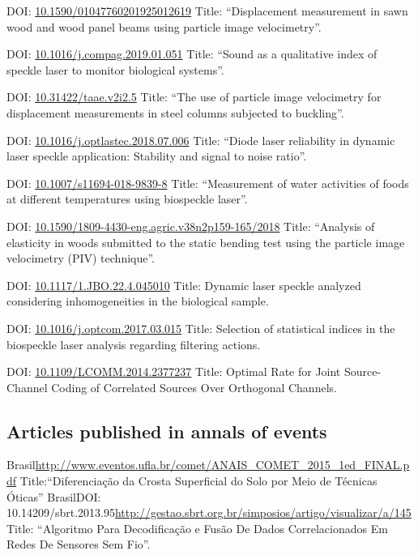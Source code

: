\documentclass[11pt,a4paper,sans]{moderncv} %
\newcommand{\doiurl}[1]{\href{https://doi.org/#1}{#1}}
\begin{document}
	      {DOI: \doiurl{10.1590/01047760201925012619}}{}{}
	      {Title: ``Displacement measurement in sawn wood and wood panel beams using particle image velocimetry''.}

	      {DOI: \doiurl{10.1016/j.compag.2019.01.051}}{}{}
	      {Title: ``Sound as a qualitative index of speckle laser to monitor biological systems''.}

	      {DOI: \doiurl{10.31422/taae.v2i2.5}}{}{}
	      {Title: ``The use of particle image velocimetry for displacement measurements in steel columns subjected to buckling''.}
	      
	      {DOI: \doiurl{10.1016/j.optlastec.2018.07.006}}{}{}
	      {Title: ``Diode laser reliability in dynamic laser speckle application: Stability and signal to noise ratio''.}
	      
	      {DOI: \doiurl{10.1007/s11694-018-9839-8}}{}{}
	      {Title: ``Measurement of water activities of foods at different temperatures using biospeckle laser''.}

	      {DOI: \doiurl{10.1590/1809-4430-eng.agric.v38n2p159-165/2018}}{}{}
	      {Title: ``Analysis of elasticity in woods submitted to the static bending test using the particle image velocimetry (PIV) technique''.}

	      {DOI: \doiurl{10.1117/1.JBO.22.4.045010}}{}{}
	      {Title: Dynamic laser speckle analyzed considering inhomogeneities in the biological sample.}
	      
	      {DOI: \doiurl{10.1016/j.optcom.2017.03.015}}{}{}
	      {Title: Selection of statistical indices in the biospeckle laser analysis regarding filtering actions.}
	      
	      {DOI: \doiurl{10.1109/LCOMM.2014.2377237}}{}{}
	      {Title: Optimal  Rate for Joint Source-Channel Coding of Correlated Sources Over Orthogonal Channels.}

\subsection{Articles published in annals of events}
	      {Brasil}{}{\url{http://www.eventos.ufla.br/comet/ANAIS\_COMET\_2015\_1ed\_FINAL.pdf}}
	      {Title:``Diferenciação da Crosta Superficial do Solo por Meio de Técnicas Óticas''}
	      {Brasil}{DOI: 10.14209/sbrt.2013.95}{\url{http://gestao.sbrt.org.br/simposios/artigo/visualizar/a/145}}
	      {Title: ``Algoritmo Para Decodificação e Fusão De Dados Correlacionados Em Redes De Sensores Sem Fio''.}
\end{document}

